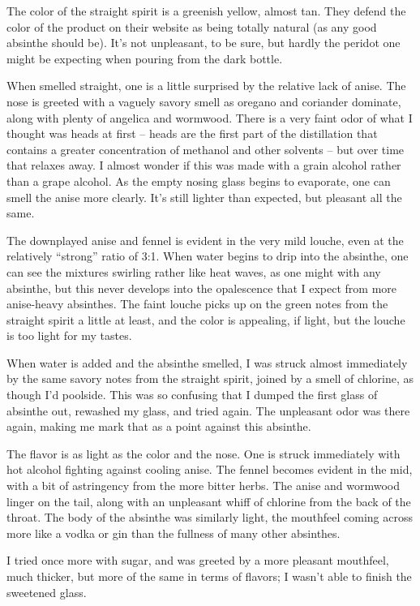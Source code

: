 \documentclass[12pt,letterpaper,oneside]{memoir}
\begin{document}
  The color of the straight spirit is a greenish yellow, almost tan.  They defend the color of the product on their website as being totally natural (as any good absinthe should be).  It's not unpleasant, to be sure, but hardly the peridot one might be expecting when pouring from the dark bottle.

  When smelled straight, one is a little surprised by the relative lack of anise.  The nose is greeted with a vaguely savory smell as oregano and coriander dominate, along with plenty of angelica and wormwood.  There is a very faint odor of what I thought was heads at first -- heads are the first part of the distillation that contains a greater concentration of methanol and other solvents -- but over time that relaxes away.  I almost wonder if this was made with a grain alcohol rather than a grape alcohol.  As the empty nosing glass begins to evaporate, one can smell the anise more clearly.  It's still lighter than expected, but pleasant all the same.

  The downplayed anise and fennel is evident in the very mild louche, even at the relatively ``strong'' ratio of 3:1.  When water begins to drip into the absinthe, one can see the mixtures swirling rather like heat waves, as one might with any absinthe, but this never develops into the opalescence that I expect from more anise-heavy absinthes.  The faint louche picks up on the green notes from the straight spirit a little at least, and the color is appealing, if light, but the louche is too light for my tastes.

  When water is added and the absinthe smelled, I was struck almost immediately by the same savory notes from the straight spirit, joined by a smell of chlorine, as though I'd poolside.  This was so confusing that I dumped the first glass of absinthe out, rewashed my glass, and tried again.  The unpleasant odor was there again, making me mark that as a point against this absinthe.

  The flavor is as light as the color and the nose.  One is struck immediately with hot alcohol fighting against cooling anise.  The fennel becomes evident in the mid, with a bit of astringency from the more bitter herbs.  The anise and wormwood linger on the tail, along with an unpleasant whiff of chlorine from the back of the throat.  The body of the absinthe was similarly light, the mouthfeel coming across more like a vodka or gin than the fullness of many other absinthes.

  I tried once more with sugar, and was greeted by a more pleasant mouthfeel, much thicker, but more of the same in terms of flavors; I wasn't able to finish the sweetened glass.
\end{document}
